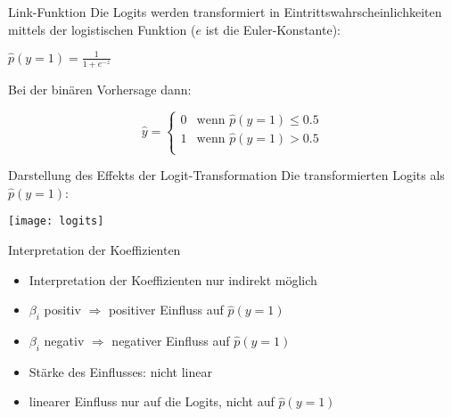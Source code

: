 \begin{frame}
  {Link-Funktion}
  Die Logits werden transformiert in Eintrittswahrscheinlichkeiten\\
  mittels der \alert{logistischen Funktion} ($e$ ist die Euler-Konstante):
  \begin{center}
    $\hat{p}(y=1)=\frac{1}{1+e^{-z}}$
  \end{center}
  \pause
  Bei der \alert{binären Vorhersage} dann:
  \begin{center}
    \[\hat{y}=
      \begin{cases}
	0 & \text{wenn }\hat{p}(y=1)\leq0.5 \\
        1 & \text{wenn }\hat{p}(y=1)>0.5 \\
      \end{cases}
    \]
  \end{center}
\end{frame}

\begin{frame}
  {Darstellung des Effekts der Logit-Transformation}
  Die transformierten Logits als $\hat{p}(y=1)$:
  \begin{center}
    \texttt{[image: logits]}
  \end{center}
\end{frame}

\begin{frame}
  {Interpretation der Koeffizienten}
  \begin{itemize}[<+->]
    \item Interpretation der Koeffizienten nur \alert{indirekt} möglich
    \item $\beta_i$ positiv $\Rightarrow$ positiver Einfluss auf $\hat{p}(y=1)$
    \item $\beta_i$ negativ $\Rightarrow$ negativer Einfluss auf $\hat{p}(y=1)$
    \item Stärke des Einflusses: \alert{nicht linear}
    \item linearer Einfluss nur auf die Logits, nicht auf $\hat{p}(y=1)$
  \end{itemize}
\end{frame}

